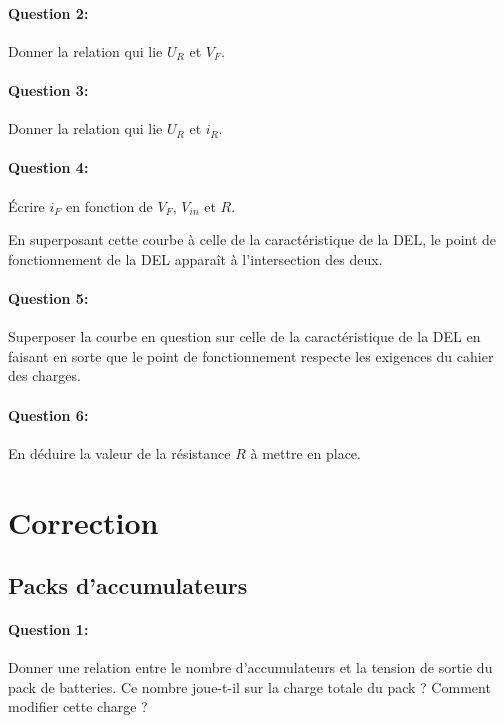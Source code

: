\paragraph{Question 2:} Donner la relation qui lie $U_R$ et $V_F$.

\paragraph{Question 3:} Donner la relation qui lie $U_R$ et $i_R$.

\paragraph{Question 4:} Écrire $i_F$ en fonction de $V_F$, $V_{in}$ et $R$. 

En superposant cette courbe à celle de la caractéristique de la DEL, le point de fonctionnement de la DEL apparaît à l'intersection des deux.

\paragraph{Question 5:} Superposer la courbe en question sur celle de la caractéristique de la DEL en faisant en sorte que le point de fonctionnement respecte les exigences du cahier des charges.

\paragraph{Question 6:} En déduire la valeur de la résistance $R$ à mettre en place.

\ifdef{\public}{}

\newpage

\pagestyle{correction}

\section{Correction}

\subsection{Packs d'accumulateurs}
 
\paragraph{Question 1:} Donner une relation entre le nombre d'accumulateurs et la tension de sortie du pack de batteries. Ce nombre joue-t-il sur la charge totale du pack ? Comment modifier cette charge ?

